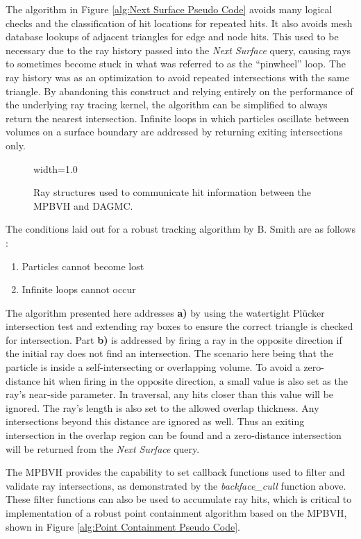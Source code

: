 The algorithm in Figure \ref{alg:Next Surface Pseudo Code} avoids many logical
checks and the classification of hit locations for repeated hits. It also avoids
mesh database lookups of adjacent triangles for edge and node hits. This used to
be necessary due to the ray history passed into the \textit{Next Surface} query,
causing rays to sometimes become stuck in what was referred to as the
``pinwheel'' loop. The ray history was as an optimization to avoid repeated
intersections with the same triangle. By abandoning this construct and relying
entirely on the performance of the underlying ray tracing kernel, the algorithm
can be simplified to always return the nearest intersection. Infinite loops in
which particles oscillate between volumes on a surface boundary are addressed by
returning exiting intersections only.

\begin{figure}[H]
  \centering
  {width=1.0\textwidth}
  \caption{Ray structures used to communicate hit information between the MPBVH and DAGMC.}
  \label{fig:mpbvh_ray_structures}  
\end{figure}

The conditions laid out for a robust tracking
algorithm by B. Smith are as follows \cite{Smith_2011}:

\begin{enumerate}[a]
  \item Particles cannot become lost
  \item Infinite loops cannot occur
\end{enumerate}

The algorithm presented here addresses \textbf{a)} by using the watertight
Pl\"{u}cker intersection test and extending ray boxes to ensure the correct
triangle is checked for intersection. Part \textbf{b)} is addressed by firing a
ray in the opposite direction if the initial ray does not find an
intersection. The scenario here being that the particle is inside a
self-intersecting or overlapping volume. To avoid a zero-distance hit when
firing in the opposite direction, a small value is also set as the ray's
near-side parameter. In traversal, any hits closer than this value will be
ignored. The ray's length is also set to the allowed overlap thickness. Any
intersections beyond this distance are ignored as well. Thus an exiting
intersection in the overlap region can be found and a zero-distance intersection
will be returned from the \textit{Next Surface} query.

The MPBVH provides the capability to set callback functions used to filter and
validate ray intersections, as demonstrated by the \textit{backface\_cull}
function above. These filter functions can also be used to accumulate ray hits,
which is critical to implementation of a robust point containment algorithm
based on the MPBVH, shown in Figure \ref{alg:Point Containment Pseudo Code}.


